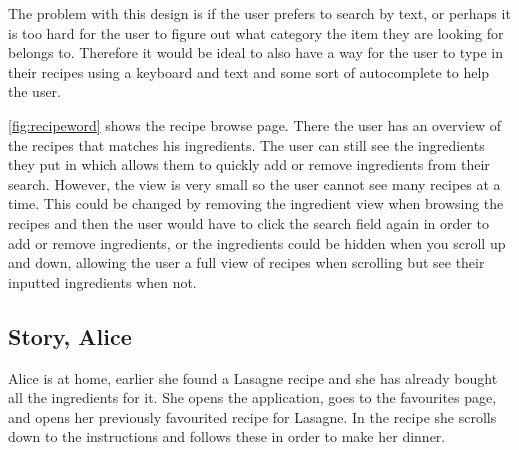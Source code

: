 The problem with this design is if the user prefers to search by text, or perhaps it is too hard for the user to figure out what category the item they are looking for belongs to. Therefore it would be ideal to also have a way for the user to type in their recipes using a keyboard and text and some sort of autocomplete to help the user.

\autoref{fig:recipeword} shows the recipe browse page. There the user has an overview of the recipes that matches his ingredients. The user can still see the ingredients they put in which allows them to quickly add or remove ingredients from their search. However, the view is very small so the user cannot see many recipes at a time. This could be changed by removing the ingredient view when browsing the recipes and then the user would have to click the search field again in order to add or remove ingredients, or the ingredients could be hidden when you scroll up and down, allowing the user a full view of recipes when scrolling but see their inputted ingredients when not. 

\subsection*{Story, Alice}

Alice is at home, earlier she found a Lasagne recipe and she has already bought all the ingredients for it. She opens the application, goes to the favourites page, and opens her previously favourited recipe for Lasagne. In the recipe she scrolls down to the instructions and follows these in order to make her dinner.


